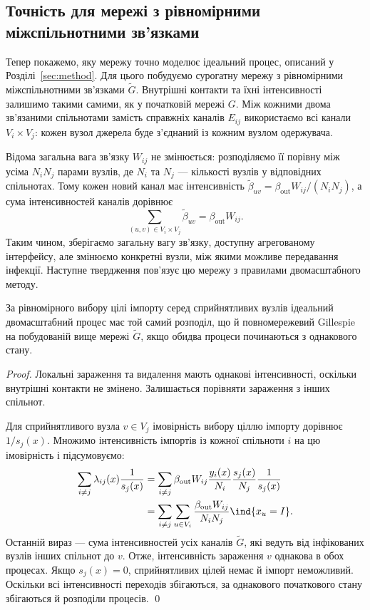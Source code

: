 
\subsection{Точність для мережі з рівномірними міжспільнотними зв’язками}
\label{sec:surrogate}

Тепер покажемо, яку мережу точно моделює ідеальний процес,
описаний у Розділі~\ref{sec:method}. Для цього побудуємо
сурогатну мережу з рівномірними міжспільнотними зв’язками
$\tilde G$. Внутрішні контакти та їхні інтенсивності залишимо
такими самими, як у початковій мережі $G$. Між кожними двома
зв’язаними спільнотами замість справжніх каналів $E_{ij}$
використаємо всі канали $V_i\times V_j$: кожен вузол джерела
буде з’єднаний із кожним вузлом одержувача.

Відома загальна вага зв’язку $W_{ij}$ не змінюється:
розподіляємо її порівну між усіма $N_iN_j$ парами вузлів,
де $N_i$ та $N_j$ --- кількості вузлів у відповідних спільнотах.
Тому кожен новий канал має інтенсивність
$\tilde\beta_{uv}=\beta_{\mathrm{out}}W_{ij}/(N_iN_j)$,
а сума інтенсивностей каналів дорівнює
\[
\sum_{(u,v)\in V_i\times V_j}\tilde\beta_{uv}
=\beta_{\mathrm{out}}W_{ij}.
\]
Таким чином, зберігаємо загальну вагу зв’язку, доступну
агрегованому інтерфейсу, але змінюємо конкретні вузли,
між якими можливе передавання інфекції. Наступне твердження
пов’язує цю мережу з правилами двомасштабного методу.

\begin{proposition}
\label{prop:surrogate}
За рівномірного вибору цілі імпорту серед сприйнятливих вузлів
ідеальний двомасштабний процес має той самий розподіл,
що й повномережевий Gillespie на побудованій вище мережі
$\tilde G$, якщо обидва процеси починаються з однакового стану.
\end{proposition}

\begin{proof}
Локальні зараження та видалення мають однакові інтенсивності,
оскільки внутрішні контакти не змінено. Залишається порівняти
зараження з інших спільнот.

Для сприйнятливого вузла $v\in V_j$ імовірність вибору ціллю
імпорту дорівнює $1/s_j(x)$. Множимо інтенсивність імпортів
із кожної спільноти $i$ на цю імовірність і підсумовуємо:
\[
\begin{aligned}
\sum_{i\neq j}\lambda_{ij}(x)\frac{1}{s_j(x)}
&=\sum_{i\neq j}\beta_{\mathrm{out}}W_{ij}
\frac{y_i(x)}{N_i}\frac{s_j(x)}{N_j}\frac{1}{s_j(x)}\\
&=\sum_{i\neq j}\sum_{u\in V_i}
\frac{\beta_{\mathrm{out}}W_{ij}}{N_iN_j}\ind\{x_u=I\}.
\end{aligned}
\]
Останній вираз --- сума інтенсивностей усіх каналів $\tilde G$,
які ведуть від інфікованих вузлів інших спільнот до $v$.
Отже, інтенсивність зараження $v$ однакова в обох процесах.
Якщо $s_j(x)=0$, сприйнятливих цілей немає й імпорт неможливий.
Оскільки всі інтенсивності переходів збігаються, за однакового
початкового стану збігаються й розподіли процесів. \qed
\end{proof}


